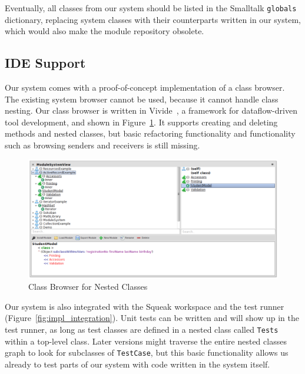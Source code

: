 Eventually, all classes from our system should be listed in the Smalltalk \texttt{globals} dictionary, replacing system classes with their counterparts written in our system, which would also make the module repository obsolete.

\subsection{IDE Support}
Our system comes with a proof-of-concept implementation of a class browser. The existing system browser cannot be used, because it cannot handle class nesting. Our class browser is written in Vivide~\cite{Taeumel:2012:VPE:2384592.2384604}, a framework for dataflow-driven tool development, and shown in Figure~\ref{fig:impl_class_browser}. It supports creating and deleting methods and nested classes, but basic refactoring functionality and functionality such as browsing senders and receivers is still missing.

\begin{figure}[!htp]
	\centering
	\includegraphics[width=\textwidth]{screenshot_classbrowser.png}
	\caption{Class Browser for Nested Classes}
	\label{fig:impl_class_browser}
\end{figure}

Our system is also integrated with the Squeak workspace and the test runner (Figure~\ref{fig:impl_integration}). Unit tests can be written and will show up in the test runner, as long as test classes are defined in a nested class called \texttt{Tests} within a top-level class. Later versions might traverse the entire nested classes graph to look for subclasses of \texttt{TestCase}, but this basic functionality allows us already to test parts of our system with code written in the system itself.


